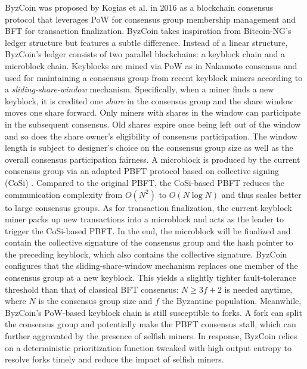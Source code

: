 ByzCoin was proposed by Kogias et al.  in 2016 as a blockchain consensus protocol that leverages PoW for consensus group membership management and BFT for transaction finalization. 
{\color{\rcolor}
ByzCoin takes inspiration from Bitcoin-NG's ledger structure but features a subtle difference. Instead of a linear structure,
}
ByzCoin's ledger consists of two parallel blockchains: a keyblock chain and a microblock chain. Keyblocks are mined via PoW as in Nakamoto consensus and used for maintaining a consensus group from recent keyblock miners according to a \textit{sliding-share-window} mechanism.
{\color{\rcolor}
Specifically, when a miner finds a new keyblock, it is credited one \textit{share} in the consensus group and the share window moves one share forward. Only miners with shares in the window can participate in the subsequent consensus. Old shares expire once being left out of the window and so does the share owner's eligibility of consensus participation. The window length is subject to designer's choice on the consensus group size as well as the overall consensus participation fairness.
}
A microblock is produced by the current consensus group via an adapted PBFT protocol based on collective signing (CoSi) . Compared to the original PBFT, the CoSi-based PBFT reduces the communication complexity from $O(N^2)$ to $O(N\log N)$ and thus scales better to large consensus groups. As for transaction finalization, the current keyblock miner packs up new transactions into a microblock and acts as the leader to trigger the CoSi-based PBFT. In the end, the microblock will be finalized and contain the collective signature of the consensus group and the hash pointer to the preceding keyblock, which also contains the collective signature.
ByzCoin configures that the sliding-share-window mechanism replaces one member of the consensus group at a new keyblock. This yields a slightly tighter fault-tolerance threshold than that of classical BFT consensus: $N\geq3f+2$ is needed anytime, where $N$ is the consensus group size and $f$ the Byzantine population. Meanwhile, ByzCoin's PoW-based keyblock chain is still susceptible to forks. A fork can split the consensus group and potentially make the PBFT consensus stall, which can further aggravated by the presence of selfish miners. In response, ByzCoin relies on a deterministic prioritization function tweaked with high output entropy to resolve forks timely and reduce the impact of selfish miners.

